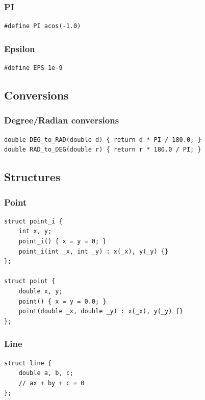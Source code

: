 \documentclass[10pt]{article}
\begin{document}
\begin{multicols*}{2}
\subsubsection{PI}
\begin{lstlisting}[style=compactcpp]
#define PI acos(-1.0)
\end{lstlisting}

\subsubsection{Epsilon}
\begin{lstlisting}[style=compactcpp]
#define EPS 1e-9
\end{lstlisting}

\subsection{Conversions}
\subsubsection{Degree/Radian conversions}
\begin{lstlisting}[style=compactcpp]
double DEG_to_RAD(double d) { return d * PI / 180.0; }
double RAD_to_DEG(double r) { return r * 180.0 / PI; }
\end{lstlisting}

\subsection{Structures}
\subsubsection{Point}
\begin{lstlisting}[style=compactcpp]
struct point_i {
    int x, y;
    point_i() { x = y = 0; }
    point_i(int _x, int _y) : x(_x), y(_y) {}
};

struct point {
    double x, y;
    point() { x = y = 0.0; }
    point(double _x, double _y) : x(_x), y(_y) {}
};
\end{lstlisting}

\subsubsection{Line}
\begin{lstlisting}[style=compactcpp]
struct line {
    double a, b, c;
    // ax + by + c = 0
};
\end{lstlisting}


\end{multicols*}
\end{document}
